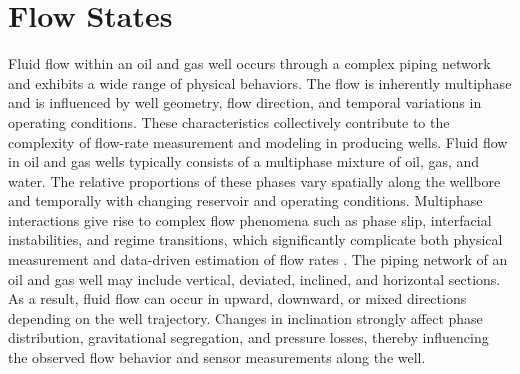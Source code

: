 \documentclass[12pt,APA]{uomthesis}
\begin{document}
\begin{table}[!htb]
\end{table}


\section{Flow States}
Fluid flow within an oil and gas well occurs through a complex piping network and exhibits a wide range of physical behaviors. The flow is inherently multiphase and is influenced by well geometry, flow direction, and temporal variations in operating conditions. These characteristics collectively contribute to the complexity of flow-rate measurement and modeling in producing wells.
Fluid flow in oil and gas wells typically consists of a multiphase mixture of oil, gas, and water. The relative proportions of these phases vary spatially along the wellbore and temporally with changing reservoir and operating conditions. Multiphase interactions give rise to complex flow phenomena such as phase slip, interfacial instabilities, and regime transitions, which significantly complicate both physical measurement and data-driven estimation of flow rates \citep{brill1999multiphase}.
The piping network of an oil and gas well may include vertical, deviated, inclined, and horizontal sections. As a result, fluid flow can occur in upward, downward, or mixed directions depending on the well trajectory. Changes in inclination strongly affect phase distribution, gravitational segregation, and pressure losses, thereby influencing the observed flow behavior and sensor measurements along the well.
\end{document}
